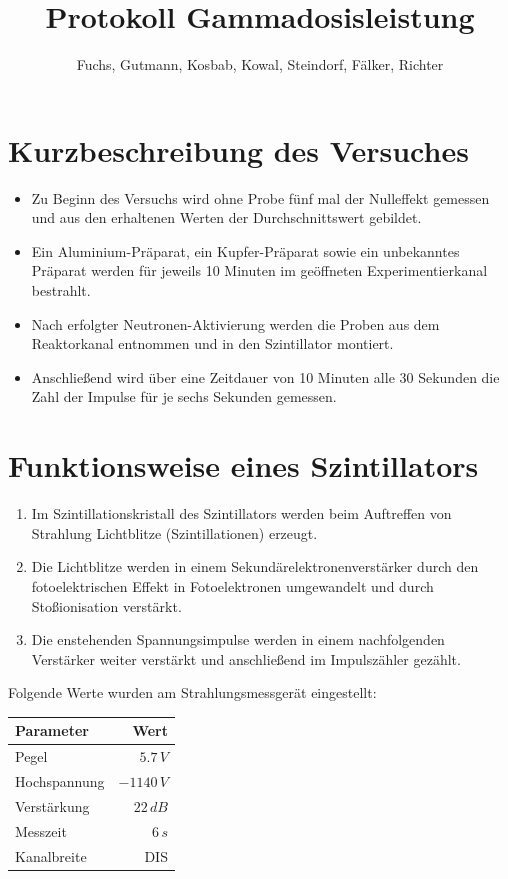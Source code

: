 \documentclass[12pt,german]{article}
\title{\vspace{-1.5cm}Protokoll Gammadosisleistung}
\author{Fuchs, Gutmann, Kosbab, Kowal, Steindorf, Fälker, Richter}
\begin{document}
    \maketitle
    \tableofcontents

    \section{Kurzbeschreibung des Versuches}
    \begin{itemize}
        \item Zu Beginn des Versuchs wird ohne Probe fünf mal der Nulleffekt gemessen und aus den erhaltenen Werten der Durchschnittswert gebildet.
        \item Ein Aluminium-Präparat, ein Kupfer-Präparat sowie ein unbekanntes Präparat werden für jeweils 10 Minuten im geöffneten Experimentierkanal bestrahlt.
        \item Nach erfolgter Neutronen-Aktivierung werden die Proben aus dem Reaktorkanal entnommen und in den Szintillator montiert.
        \item Anschließend wird über eine Zeitdauer von 10 Minuten alle 30 Sekunden die Zahl der Impulse für je sechs Sekunden gemessen.
    \end{itemize}

    \section{Funktionsweise eines Szintillators}
    \begin{enumerate}
        \item Im Szintillationskristall des Szintillators werden beim Auftreffen von Strahlung Lichtblitze (Szintillationen) erzeugt.
        \item Die Lichtblitze werden in einem Sekundärelektronenverstärker durch den fotoelektrischen Effekt in Fotoelektronen umgewandelt und durch Stoßionisation verstärkt.
        \item Die enstehenden Spannungsimpulse werden in einem nachfolgenden Verstärker weiter verstärkt und anschließend im Impulszähler gezählt.
    \end{enumerate}
    Folgende Werte wurden am Strahlungsmessgerät eingestellt:
    \begin{table}[H]
        \centering
        \begin{tabularx}{0.7\textwidth}{L|R}
            \toprule
            \textbf{Parameter} & \textbf{Wert} \\
            \midrule
            Pegel & $5.7\, V$ \\
            Hochspannung & $-1140\, V$ \\
            Verstärkung & $22\, dB$ \\
            Messzeit & $6\, s$ \\
            Kanalbreite & DIS \\
            \bottomrule
        \end{tabularx}
    \end{table}
\end{document}
